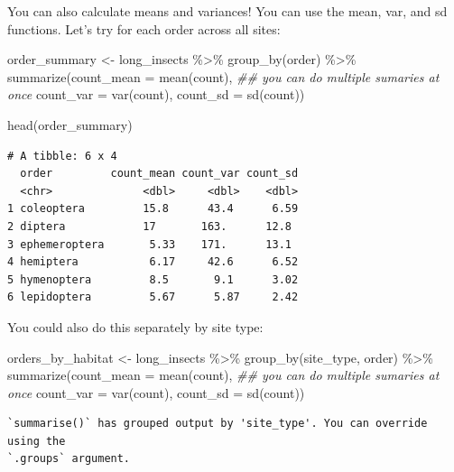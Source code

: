 \documentclass[
  letterpaper,
  DIV=11,
  numbers=noendperiod]{scrreprt}
\newenvironment{Shaded}{\begin{snugshade}}{\end{snugshade}}
\newcommand{\AttributeTok}[1]{\textcolor[rgb]{0.40,0.45,0.13}{#1}}
\newcommand{\DocumentationTok}[1]{\textcolor[rgb]{0.37,0.37,0.37}{\textit{#1}}}
\newcommand{\FunctionTok}[1]{\textcolor[rgb]{0.28,0.35,0.67}{#1}}
\newcommand{\NormalTok}[1]{\textcolor[rgb]{0.00,0.23,0.31}{#1}}
\newcommand{\OtherTok}[1]{\textcolor[rgb]{0.00,0.23,0.31}{#1}}
\newcommand{\SpecialCharTok}[1]{\textcolor[rgb]{0.37,0.37,0.37}{#1}}
\begin{document}
You can also calculate means and variances! You can use the mean, var,
and sd functions. Let's try for each order across all sites:

\begin{Shaded}
\begin{Highlighting}[]
\NormalTok{order\_summary }\OtherTok{\textless{}{-}}\NormalTok{ long\_insects }\SpecialCharTok{\%\textgreater{}\%}
  \FunctionTok{group\_by}\NormalTok{(order) }\SpecialCharTok{\%\textgreater{}\%}
  \FunctionTok{summarize}\NormalTok{(}\AttributeTok{count\_mean =} \FunctionTok{mean}\NormalTok{(count), }\DocumentationTok{\#\# you can do multiple sumaries at once}
            \AttributeTok{count\_var =} \FunctionTok{var}\NormalTok{(count),}
            \AttributeTok{count\_sd =} \FunctionTok{sd}\NormalTok{(count))}

\FunctionTok{head}\NormalTok{(order\_summary)}
\end{Highlighting}
\end{Shaded}

\begin{verbatim}
# A tibble: 6 x 4
  order         count_mean count_var count_sd
  <chr>              <dbl>     <dbl>    <dbl>
1 coleoptera         15.8      43.4      6.59
2 diptera            17       163.      12.8 
3 ephemeroptera       5.33    171.      13.1 
4 hemiptera           6.17     42.6      6.52
5 hymenoptera         8.5       9.1      3.02
6 lepidoptera         5.67      5.87     2.42
\end{verbatim}

You could also do this separately by site type:

\begin{Shaded}
\begin{Highlighting}[]
\NormalTok{orders\_by\_habitat }\OtherTok{\textless{}{-}}\NormalTok{ long\_insects }\SpecialCharTok{\%\textgreater{}\%}
  \FunctionTok{group\_by}\NormalTok{(site\_type, order) }\SpecialCharTok{\%\textgreater{}\%}
  \FunctionTok{summarize}\NormalTok{(}\AttributeTok{count\_mean =} \FunctionTok{mean}\NormalTok{(count), }\DocumentationTok{\#\# you can do multiple sumaries at once}
            \AttributeTok{count\_var =} \FunctionTok{var}\NormalTok{(count),}
            \AttributeTok{count\_sd =} \FunctionTok{sd}\NormalTok{(count))}
\end{Highlighting}
\end{Shaded}

\begin{verbatim}
`summarise()` has grouped output by 'site_type'. You can override using the
`.groups` argument.
\end{verbatim}
\end{document}
